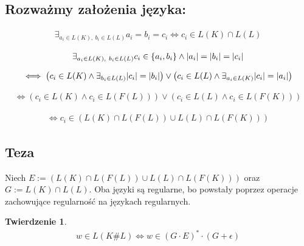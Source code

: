 \documentclass{article}
\newtheorem{theorem}{Twierdzenie}[section]
\theoremstyle{definition}
\theoremstyle{remark}
\begin{document}
\subsection{Rozważmy założenia języka:}

\begin{align*}
    \exists_{ a_i \in L(K), \ b_i \in L(L)} { a_i = b_i = c_i }\iff c_i \in L(K) \cap L(L)
\end{align*}

\begin{align*}
\exists_{ a_i \in L(K), \ b_i \in L(L)} { c_i \in \left\{ a_i, b_i \right\} \land \abs{a_i}=\abs{b_i}=\abs{c_i} }
\end{align*}

\begin{align*}
\iff
\left( c_i \in L(K) \land \exists_{ b_i \in L(L) }{ \abs{c_i} = \abs{b_i} } \right) \lor \left( c_i \in L(L) \land \exists_{ a_i \in L(K) }{ \abs{c_i} = \abs{a_i} } \right)
\end{align*}

\begin{align*}
    \iff
    \left( c_i \in L(K) \land c_i \in L(F(L)) \right) \lor \left( c_i \in L(L) \land c_i \in L(F(K)) \right)
\end{align*}

\begin{align*}
    \iff
    c_i \in \left( L(K) \cap L(F(L)) \cup L(L) \cap L(F(K)) \right)
\end{align*}

\subsection{Teza}

Niech \( E := \left( L(K) \cap L(F(L)) \cup L(L) \cap L(F(K)) \right) \) oraz \( G := L(K) \cap L(L) \).
Oba języki są regularne, bo powstały poprzez operacje zachowujące regularność na językach regularnych.

\begin{theorem}
    \begin{align*}
        w \in L(K \# L) \iff w \in \left( G \cdot E \right)^* \cdot \left( G + \epsilon \right)
    \end{align*}
\end{theorem}
\end{document}
